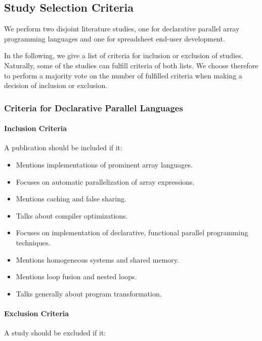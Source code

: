 \documentclass[a4paper]{article}
\begin{document}
\subsection{Study Selection Criteria}
\label{sec:study-select-crit}

We perform two disjoint literature studies, one for declarative
parallel array programming languages and one for spreadsheet end-user
development.

In the following, we give a list of criteria for inclusion or
exclusion of studies. Naturally, some of the studies can fulfill
criteria of both lists. We choose therefore to perform a majority vote
on the number of fulfilled criteria when making a decision of
inclusion or exclusion.

\subsubsection{Criteria for Declarative Parallel Languages}
\label{sec:crit-decl-parall}

\paragraph{Inclusion Criteria}

A publication should be included if it:

\begin{itemize}
\item Mentions implementations of prominent array languages.
\item Focuses on automatic parallelization of array expressions.
\item Mentions caching and false sharing.
\item Talks about compiler optimizations.
\item Focuses on implementation of declarative, functional parallel
  programming techniques.
\item Mentions homogeneous systems and shared memory.
\item Mentions loop fusion and nested loops.
\item Talks generally about program transformation.
\end{itemize}

\paragraph{Exclusion Criteria}

A study should be excluded if it:
\end{document}
